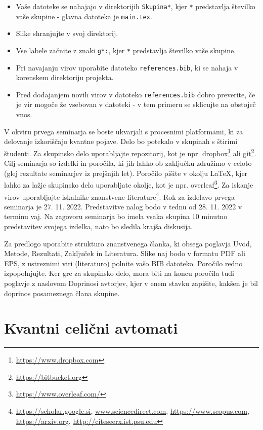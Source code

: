 \begin{itemize}
\item Vaše datoteke se nahajajo v direktorijih \texttt{Skupina*}, kjer \texttt{*} predstavlja številko vaše skupine - glavna datoteka je \texttt{main.tex}.
\item Slike shranjujte v svoj direktorij.
\item Vse labele začnite z znaki \texttt{g*:}, kjer \texttt{*} predstavlja številko vaše skupine.
\item Pri navajanju virov uporabite datoteko \texttt{references.bib}, ki se nahaja v korenskem direktoriju projekta.
\item Pred dodajanjem novih virov v datoteko \texttt{references.bib} dobro preverite, če je vir mogoče že vsebovan v datoteki - v tem primeru se sklicujte na obstoječ vnos.
\end{itemize}


V okviru prvega seminarja se boste ukvarjali s procesnimi platformami, ki za delovanje izkoriščajo kvantne pojave. Delo bo potekalo v skupinah s štirimi študenti. Za skupinsko delo uporabljajte repozitorij, kot je npr. dropbox\footnote{\url{https://www.dropbox.com}} ali git\footnote{\url{https://bitbucket.org}}. Cilj seminarja so izdelki in poročila, ki jih lahko ob zaključku združimo v celoto (glej rezultate seminarjev iz prejšnjih let). Poročilo pišite v okolju LaTeX, kjer lahko za lažje skupinsko delo uporabljate okolje, kot je npr. overleaf\footnote{\url{https://www.overleaf.com/}}. Za iskanje virov uporabljajte iskalnike znanstvene literature\footnote{\url{https://scholar.google.si}, \url{www.sciencedirect.com}, \url{https://www.scopus.com}, \url{https://arxiv.org}, \url{http://citeseerx.ist.psu.edu}}. Rok za izdelavo prvega seminarja je 27. 11. 2022. Predstavitve nalog bodo v tednu od 28. 11. 2022 v terminu vaj. Na zagovoru seminarja bo imela vsaka skupina 10 minutno predstavitev svojega izdelka, nato bo sledila krajša diskusija.

Za predlogo uporabite strukturo znanstvenega članka, ki obsega poglavja Uvod, Metode, Rezultati, Zaključek in Literatura. Slike naj bodo v formatu PDF ali EPS, z ustreznimi viri (literaturo) polnite vašo BIB datoteko. Poročilo redno izpopolnjujte. Ker gre za skupinsko delo, mora biti na koncu poročila tudi poglavje z naslovom Doprinosi avtorjev, kjer v enem stavku zapišite, kakšen je bil doprinos posameznega člana skupine.




\section*{Kvantni celični avtomati}
\label{g00:sec:qca}

